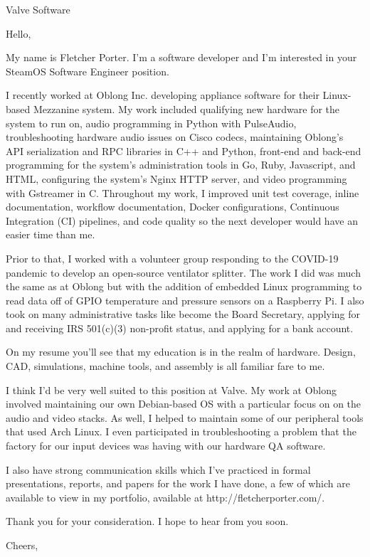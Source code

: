 \documentclass[12pt,american,german,british]{letter}
\begin{document}
\raggedright

\begin{letter}{Valve Software}

\opening{Hello,}

My name is Fletcher Porter.  I'm a software developer and I'm interested in
your SteamOS Software Engineer position.

I recently worked at Oblong Inc. developing appliance software for their
Linux-based Mezzanine system.  My work included qualifying new hardware for the
system to run on, audio programming in Python with PulseAudio,
troubleshooting hardware audio issues on Cisco codecs, maintaining Oblong's API
serialization and RPC libraries in C++ and Python, front-end and back-end
programming for the system's administration tools in Go, Ruby, Javascript, and
HTML, configuring the system's Nginx HTTP server, and video programming with
Gstreamer in C.  Throughout my work, I improved unit test coverage, inline
documentation, workflow documentation, Docker configurations, Continuous
Integration (CI) pipelines, and code quality so the next developer would have
an easier time than me.

Prior to that, I worked with a volunteer group responding to the COVID-19
pandemic to develop an open-source ventilator splitter.  The work I did was
much the same as at Oblong but with the addition of embedded Linux programming
to read data off of GPIO temperature and pressure sensors on a Raspberry Pi.  I
also took on many administrative tasks like become the Board Secretary,
applying for and receiving IRS 501(c)(3) non-profit status, and applying for a
bank account.

On my resume you'll see that my education is in the realm of hardware.  Design, 
CAD, simulations, machine tools, and assembly is all familiar fare to me.

I think I'd be very well suited to this position at Valve.  My work at Oblong
involved maintaining our own Debian-based OS with a particular focus on on the
audio and video stacks.  As well, I helped to maintain some of our peripheral
tools that used Arch Linux.  I even participated in troubleshooting a problem
that the factory for our input devices was having with our hardware QA software.

I also have strong communication skills which I've practiced in formal
presentations, reports, and papers for the work I have done, a few of which are
available to view in my portfolio, available at http://fletcherporter.com/.

Thank you for your consideration.  I hope to hear from you soon.


\closing{Cheers,}

\end{letter}
\end{document}
